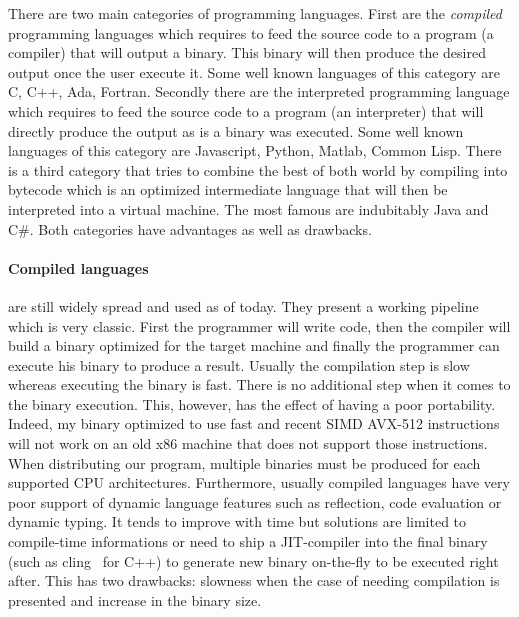 There are two main categories of programming languages. First are the \emph{compiled} programming languages which
requires to feed the source code to a program (a compiler) that will output a binary. This binary will then produce the
desired output once the user execute it. Some well known languages of this category are C, C++, Ada, Fortran. Secondly
there are the interpreted programming language which requires to feed the source code to a program (an interpreter) that
will directly produce the output as is a binary was executed. Some well known languages of this category are Javascript,
Python, Matlab, Common Lisp. There is a third category that tries to combine the best of both world by compiling into
bytecode which is an optimized intermediate language that will then be interpreted into a virtual machine. The most
famous are indubitably Java and C\#. Both categories have advantages as well as drawbacks.

\paragraph{Compiled languages} are still widely spread and used as of today. They present a working pipeline which is
very classic. First the programmer will write code, then the compiler will build a binary optimized for the target
machine and finally the programmer can execute his binary to produce a result. Usually the compilation step is slow
whereas executing the binary is fast. There is no additional step when it comes to the binary execution. This, however,
has the effect of having a poor portability. Indeed, my binary optimized to use fast and recent SIMD AVX-512
instructions will not work on an old x86 machine that does not support those instructions. When distributing our
program, multiple binaries must be produced for each supported CPU architectures. Furthermore, usually compiled
languages have very poor support of dynamic language features such as reflection, code evaluation or dynamic typing. It
tends to improve with time but solutions are limited to compile-time informations or need to ship a JIT-compiler into
the final binary (such as cling~\parencite{vassilev.2012.cling} for C++) to generate new binary on-the-fly to be
executed right after. This has two drawbacks: slowness when the case of needing compilation is presented and increase in
the binary size.

